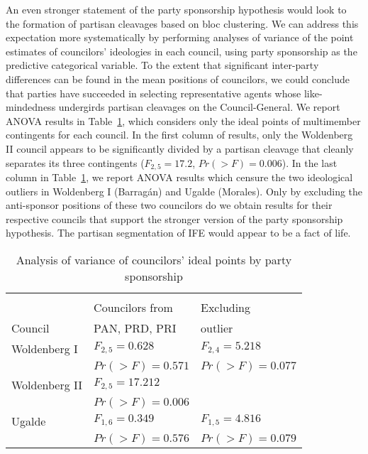 \documentclass[12 pt, letter]{article}
\begin{document}
An even stronger statement of the party sponsorship hypothesis would look to the formation of partisan cleavages based on bloc clustering.  We can address this expectation more systematically by performing analyses of variance of the point estimates of councilors' ideologies in each council, using party sponsorship as the predictive categorical variable.  To the extent that significant inter-party differences can be found in the mean positions of councilors, we could conclude that parties have succeeded in selecting representative agents whose like-mindedness undergirds partisan cleavages on the Council-General.  We report ANOVA results in Table~\ref{T:anova}, which considers only the ideal points of multimember contingents for each council.  In the first column of results, only the Woldenberg II council appears to be significantly divided by a partisan cleavage that cleanly separates its three contingents ($F_{2,5}=17.2$, $Pr(>F)=0.006$).  In the last column in Table~\ref{T:anova}, we report ANOVA results which censure the two ideological outliers in Woldenberg I (Barrag\'an) and Ugalde (Morales).  Only by excluding the anti-sponsor positions of these two councilors do we obtain results for their respective councils that support the stronger version of the party sponsorship hypothesis.  The partisan segmentation of IFE would appear to be a fact of life.

\begin{table}
\caption{Analysis of variance of councilors' ideal points by party sponsorship}\label{T:anova}
\begin{center}
\begin{tabular}{lll}
\hline\\[-1.5ex]
              & Councilors from & Excluding\\
Council       & PAN, PRD, PRI   & outlier          \\  \hline
Woldenberg I  & $F_{2,5}=0.628$ & $F_{2,4}=5.218$ \\
              & $Pr(>F)=0.571$  & $Pr(>F)=0.077$  \\
Woldenberg II & $F_{2,5}=17.212$&  \\
              & $Pr(>F)=0.006$  &  \\
Ugalde        & $F_{1,6}=0.349$ & $F_{1,5}=4.816$ \\
              & $Pr(>F)=0.576$  & $Pr(>F)=0.079$ \\ \hline
\end{tabular}
\end{center}
\end{table}
\end{document}
